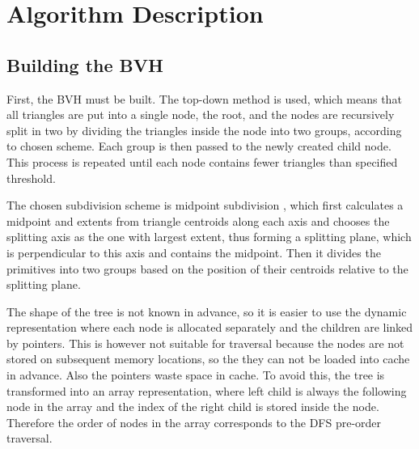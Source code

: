 \documentclass[report,11pt]{elsarticle}
\begin{document}
\section{\label{SEC:Description}Algorithm Description}
\subsection{Building the BVH}
First, the BVH must be built. The top-down method is used, which means that all triangles are put into a single node, the root, and the nodes are recursively split in two by dividing the triangles inside the node into two groups, according to chosen scheme. Each group is then passed to the newly created child node. This process is repeated until each node contains fewer triangles than specified threshold.

The chosen subdivision scheme is midpoint subdivision \cite{Pharr}, which first calculates a midpoint and extents from triangle centroids along each axis and chooses the splitting axis as the one with largest extent, thus forming a splitting plane, which is perpendicular to this axis and contains the midpoint. Then it divides the primitives into two groups based on the position of their centroids relative to the splitting plane.

The shape of the tree is not known in advance, so it is easier to use the dynamic representation where each node is allocated separately and the children are linked by pointers. This is however not suitable for traversal because the nodes are not stored on subsequent memory locations, so the they can not be loaded into cache in advance. Also the pointers waste space in cache. To avoid this, the tree is transformed into an array representation, where left child is always the following node in the array and the index of the right child is stored inside the node. Therefore the order of nodes in the array corresponds to the DFS pre-order traversal.
\end{document}

